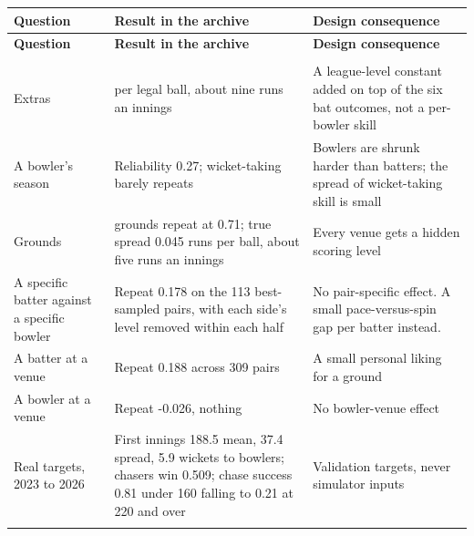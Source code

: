 \documentclass[11pt,letterpaper]{article}
\begin{document}
\begin{small}
\begin{longtable}{>{\raggedright\arraybackslash}p{}>{\raggedright\arraybackslash}p{}>{\raggedright\arraybackslash}p{}}
\toprule
\textbf{Question} & \textbf{Result in the archive} & \textbf{Design consequence} \\ \midrule
\endfirsthead
\toprule
\textbf{Question} & \textbf{Result in the archive} & \textbf{Design consequence} \\ \midrule
\endhead
\midrule \multicolumn{3}{r}{\footnotesize continued on the next page} \\ \endfoot
\bottomrule \endlastfoot
Extras & 0.0764 per legal ball, about nine runs an innings & A league-level constant added on top of the six bat outcomes, not a per-bowler skill \\ \addlinespace[2pt]
A bowler's season & Reliability 0.27; wicket-taking barely repeats & Bowlers are shrunk harder than batters; the spread of wicket-taking skill is small \\ \addlinespace[2pt]
Grounds & 18 grounds repeat at 0.71; true spread 0.045 runs per ball, about five runs an innings & Every venue gets a hidden scoring level \\ \addlinespace[2pt]
A specific batter against a specific bowler & Repeat 0.178 on the 113 best-sampled pairs, with each side's level removed within each half & No pair-specific effect. A small pace-versus-spin gap per batter instead. \\ \addlinespace[2pt]
A batter at a venue & Repeat 0.188 across 309 pairs & A small personal liking for a ground \\ \addlinespace[2pt]
A bowler at a venue & Repeat -0.026, nothing & No bowler-venue effect \\ \addlinespace[2pt]
Real targets, 2023 to 2026 & First innings 188.5 mean, 37.4 spread, 5.9 wickets to bowlers; chasers win 0.509; chase success 0.81 under 160 falling to 0.21 at 220 and over & Validation targets, never simulator inputs \\ \addlinespace[2pt]
\end{longtable}
\end{small}
\end{document}
